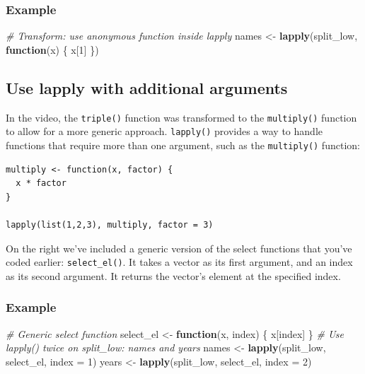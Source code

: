 \documentclass[
]{book}
\newenvironment{Shaded}{\begin{snugshade}}{\end{snugshade}}
\newcommand{\CommentTok}[1]{\textcolor[rgb]{0.56,0.35,0.01}{\textit{#1}}}
\newcommand{\ControlFlowTok}[1]{\textcolor[rgb]{0.13,0.29,0.53}{\textbf{#1}}}
\newcommand{\DataTypeTok}[1]{\textcolor[rgb]{0.13,0.29,0.53}{#1}}
\newcommand{\DecValTok}[1]{\textcolor[rgb]{0.00,0.00,0.81}{#1}}
\newcommand{\KeywordTok}[1]{\textcolor[rgb]{0.13,0.29,0.53}{\textbf{#1}}}
\newcommand{\NormalTok}[1]{#1}
\newcommand{\StringTok}[1]{\textcolor[rgb]{0.31,0.60,0.02}{#1}}
\begin{document}
\hypertarget{example-1}{%
\subsubsection{Example}\label{example-1}}

\begin{Shaded}
\begin{Highlighting}[]
\CommentTok{# Transform: use anonymous function inside lapply}
\NormalTok{names <-}\StringTok{ }\KeywordTok{lapply}\NormalTok{(split_low, }\ControlFlowTok{function}\NormalTok{(x) \{ x[}\DecValTok{1}\NormalTok{] \})}
\end{Highlighting}
\end{Shaded}

\hypertarget{use-lapply-with-additional-arguments}{%
\subsection{Use lapply with additional arguments}\label{use-lapply-with-additional-arguments}}

In the video, the \texttt{triple()} function was transformed to the \texttt{multiply()} function to allow for a more generic approach. \texttt{lapply()} provides a way to handle functions that require more than one argument, such as the \texttt{multiply()} function:

\begin{verbatim}
multiply <- function(x, factor) {
  x * factor
}

lapply(list(1,2,3), multiply, factor = 3)
\end{verbatim}

On the right we've included a generic version of the select functions that you've coded earlier: \texttt{select\_el()}. It takes a vector as its first argument, and an index as its second argument. It returns the vector's element at the specified index.

\hypertarget{example-2}{%
\subsubsection{Example}\label{example-2}}

\begin{Shaded}
\begin{Highlighting}[]
\CommentTok{# Generic select function}
\NormalTok{select_el <-}\StringTok{ }\ControlFlowTok{function}\NormalTok{(x, index) \{}
\NormalTok{  x[index]}
\NormalTok{\}}
\CommentTok{# Use lapply() twice on split_low: names and years}
\NormalTok{names <-}\StringTok{ }\KeywordTok{lapply}\NormalTok{(split_low, select_el, }\DataTypeTok{index =} \DecValTok{1}\NormalTok{)}
\NormalTok{years <-}\StringTok{ }\KeywordTok{lapply}\NormalTok{(split_low, select_el, }\DataTypeTok{index =} \DecValTok{2}\NormalTok{)}
\end{Highlighting}
\end{Shaded}
\end{document}

